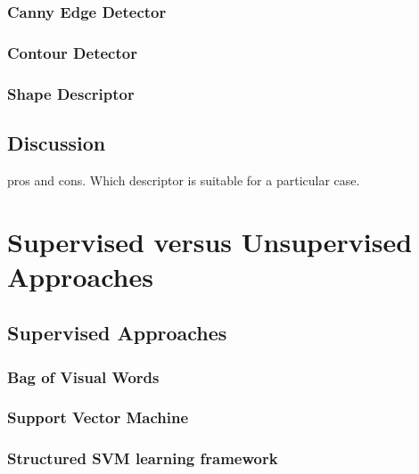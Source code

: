 \documentclass{SMBV12}
\begin{document}
\subsubsection{Canny Edge Detector}

\subsubsection{Contour Detector}

\cite{maire2008using}

\subsubsection{Shape Descriptor}

\cite{gu2009recognition}

\subsection{Discussion}

pros and cons. Which descriptor is suitable for a particular case.

\section{Supervised versus Unsupervised Approaches}



\subsection{Supervised Approaches}



\subsubsection{Bag of Visual Words}



\subsubsection{Support Vector Machine}

\subsubsection{Structured SVM learning framework}

\cite{tsochantaridis2006large}
\end{document}
